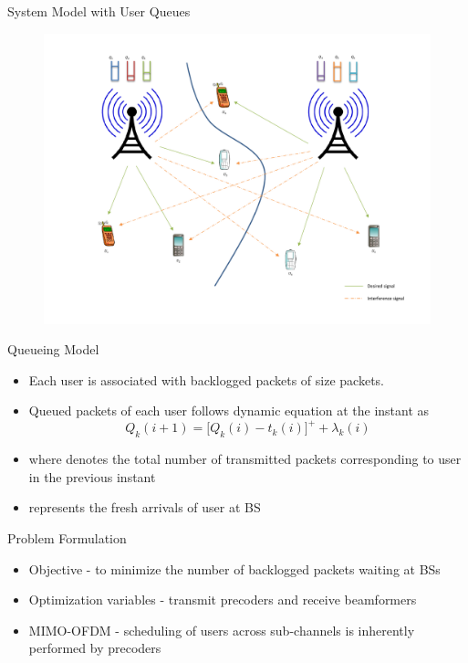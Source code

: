 \documentclass[9pt]{beamer}
\begin{document}
\begin{frame}{System Model with User Queues}
	\begin{figure}
		\centering
		\includegraphics[width=0.9\columnwidth]{system-scenario.pdf}
	\end{figure}
\end{frame}

\begin{frame}{Queueing Model}
\begin{itemize}
\item Each user is associated with backlogged packets of size  packets.
\item Queued packets  of each user follows dynamic equation at the  instant as
\begin{equation}
Q_k(i+1) = \Big [ Q_k(i) - t_k(i) \Big ]^+ + \lambda_k(i)
\label{eqn-2a}
\end{equation}
\item where  denotes the total number of transmitted packets corresponding to user  in the previous  instant
\item {} represents the fresh arrivals of user  at \ac{BS} 
\end{itemize}
\end{frame}

\begin{frame}{Problem Formulation}
\begin{itemize}
\item {\color{red}Objective} - to minimize the number of backlogged packets waiting at \acp{BS}
\item {\color{red}Optimization variables} - transmit precoders and receive beamformers
\item {\color{red}\ac{MIMO}-\ac{OFDM}} - scheduling of users across sub-channels is inherently performed by precoders
\end{itemize}
\end{frame}
\end{document}
